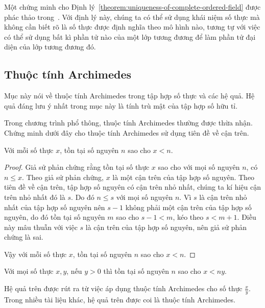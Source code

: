 Một chứng minh cho Định lý~\ref{theorem:uniqueness-of-complete-ordered-field} được phác thảo trong~\cite{spivak}. Với định lý này, chúng ta có thể sử dụng khái niệm số thực mà không cần biết rõ là số thực được định nghĩa theo mô hình nào, tương tự với việc có thể sử dụng bất kì phần tử nào của một lớp tương đương để làm phần tử đại diện của lớp tương đương đó.

\subsection{Thuộc tính Archimedes}

Mục này nói về thuộc tính Archimedes trong tập hợp số thực và các hệ quả. Hệ quả đáng lưu ý nhất trong mục này là tính trù mật của tập hợp số hữu tỉ.

Trong chương trình phổ thông, thuộc tính Archimedes thường được thừa nhận. Chứng minh dưới đây cho thuộc tính Archimedes sử dụng tiên đề về cận trên.

\begin{theorem}
	Với mỗi số thực $x$, tồn tại số nguyên $n$ sao cho $x < n$.
\end{theorem}

\begin{proof}
	Giả sử phản chứng rằng tồn tại số thực $x$ sao cho với mọi số nguyên $n$, có $n\leq x$. Theo giả sử phản chứng, $x$ là một cận trên của tập hợp số nguyên. Theo tiên đề về cận trên, tập hợp số nguyên có cận trên nhỏ nhất, chúng ta kí hiệu cận trên nhỏ nhất đó là $s$. Do đó $n\leq s$ với mọi số nguyên $n$. Vì $s$ là cận trên nhỏ nhất của tập hợp số nguyên nên $s - 1$ không phải một cận trên của tập hợp số nguyên, do đó tồn tại số nguyên $m$ sao cho $s - 1 < m$, kéo theo $s < m + 1$. Điều này mâu thuẫn với việc $s$ là cận trên của tập hợp số nguyên, nên giả sử phản chứng là sai.

	Vậy với mỗi số thực $x$, tồn tại số nguyên $n$ sao cho $x < n$.
\end{proof}

\begin{corollary}
	Với mọi số thực $x, y$, nếu $y > 0$ thì tồn tại số nguyên $n$ sao cho $x < ny$.
\end{corollary}

Hệ quả trên được rút ra từ việc áp dụng thuộc tính Archimedes cho số thực $\frac{x}{y}$. Trong nhiều tài liệu khác, hệ quả trên được coi là thuộc tính Archimedes.

